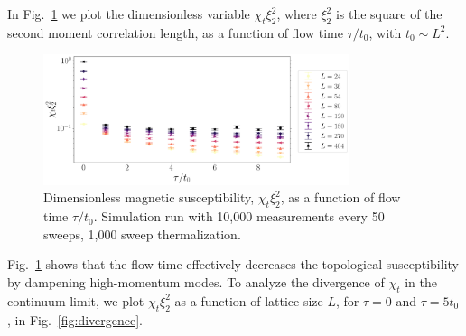 \documentclass[a4paper,11pt]{article}
\begin{document}
In Fig.~\ref{fig:bietenholz} we plot the dimensionless variable $\chi_t\xi_2^2$, where $\xi_2^2$ is the square of the second moment correlation length, as a function of flow time $\tau/t_0$, with $t_0 \sim L^2$.
\begin{figure}[h!]
    \centering
      \includegraphics[width=0.8\textwidth]{bietenholz.png}
      \caption{\label{fig:bietenholz} Dimensionless magnetic susceptibility, $\chi_t \xi_{2}^2$, as a  function of flow time $\tau/t_0$. Simulation run with 10,000 measurements every 50 sweeps, 1,000 sweep thermalization. }
\end{figure}
Fig.~\ref{fig:bietenholz} shows that the flow time effectively decreases the topological susceptibility by dampening high-momentum modes. To analyze the divergence of $\chi_t$ in the continuum limit, we plot $\chi_t \xi_2^2$ as a function of lattice size $L$, for $\tau=0$ and $\tau=5t_0$, in Fig.~\ref{fig:divergence}.
\end{document}
